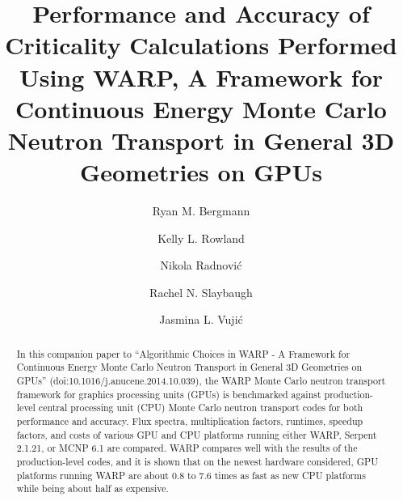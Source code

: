 \documentclass[preprint,12pt]{elsarticle}
\begin{document}
\begin{frontmatter}



\title{Performance and Accuracy of Criticality Calculations Performed Using WARP, A Framework for Continuous Energy Monte Carlo Neutron Transport in General 3D Geometries on GPUs}


\author{Ryan M. Bergmann}

\author{Kelly L. Rowland}

\author{Nikola Radnovi\'c}

\author{Rachel N. Slaybaugh}

\author{Jasmina L. Vuji\'c}


\address{Department of Nuclear Engineering, 
4155 Etcheverry Hall, 
University of California - Berkeley,
Berkeley, CA 94720-1730}

\begin{abstract}

In this companion paper to ``Algorithmic Choices in WARP - A Framework for Continuous Energy Monte Carlo Neutron Transport in General 3D Geometries on GPUs'' (doi:10.1016/j.anucene.2014.10.039), the WARP Monte Carlo neutron transport framework for graphics processing units (GPUs) is benchmarked against production-level central processing unit (CPU) Monte Carlo neutron transport codes for both performance and accuracy.  Flux spectra, multiplication factors, runtimes, speedup factors, and costs of various GPU and CPU platforms running either WARP, Serpent 2.1.21, or MCNP 6.1 are compared.  WARP compares well with the results of the production-level codes, and it is shown that on the newest hardware considered, GPU platforms running WARP are about 0.8 to 7.6 times as fast as new CPU platforms while being about half as expensive.  


\end{abstract}
\end{frontmatter}
\end{document}
